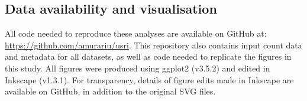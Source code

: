 \documentclass[10pt,letterpaper]{article}
\begin{document}





\subsection*{Data availability and visualisation}
All code needed to reproduce these analyses are available on GitHub at: \url{https://github.com/amurariu/usri}. This repository also contains input count data and metadata for all datasets, as well as code needed to replicate the figures in this study. All figures were produced using ggplot2 (v3.5.2) \cite{wickham_ggplot_2016} and edited in Inkscape (v1.3.1). For transparency, details of figure edits made in Inkscape are available on GitHub, in addition to the original SVG files.
\end{document}
